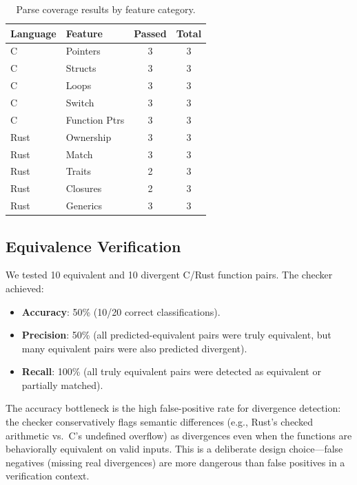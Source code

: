 \documentclass[11pt,a4paper]{article}
\begin{document}
\begin{table}[t]
\centering
\caption{Parse coverage results by feature category.}
\label{tab:parse}
\begin{tabular}{llcc}
\toprule
Language & Feature & Passed & Total \\
\midrule
C & Pointers         & 3 & 3 \\
C & Structs          & 3 & 3 \\
C & Loops            & 3 & 3 \\
C & Switch           & 3 & 3 \\
C & Function Ptrs    & 3 & 3 \\
\midrule
Rust & Ownership     & 3 & 3 \\
Rust & Match         & 3 & 3 \\
Rust & Traits        & 2 & 3 \\
Rust & Closures      & 2 & 3 \\
Rust & Generics      & 3 & 3 \\
\bottomrule
\end{tabular}
\end{table}

\subsection{Equivalence Verification}\label{sec:exp-equiv}

We tested 10 equivalent and 10 divergent C/Rust function pairs.
The checker achieved:
\begin{itemize}
  \item \textbf{Accuracy}: 50\% (10/20 correct classifications).
  \item \textbf{Precision}: 50\% (all predicted-equivalent pairs
    were truly equivalent, but many equivalent pairs were also
    predicted divergent).
  \item \textbf{Recall}: 100\% (all truly equivalent pairs were
    detected as equivalent or partially matched).
\end{itemize}

The accuracy bottleneck is the high false-positive rate for divergence
detection: the checker conservatively flags semantic differences
(e.g., Rust's checked arithmetic vs.\ C's undefined overflow) as
divergences even when the functions are behaviorally equivalent on
valid inputs. This is a deliberate design choice---false negatives
(missing real divergences) are more dangerous than false positives
in a verification context.
\end{document}
